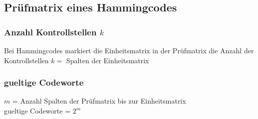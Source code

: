 \subsection{Prüfmatrix eines Hammingcodes}

\subsubsection{Anzahl Kontrollstellen $k$}
Bei Hammingcodes markiert die Einheitsmatrix in der Prüfmatrix die Anzahl der Kontrollstellen \colorbox{lightlightgrey}{$k = $ Spalten der Einheitsmatrix}

\subsubsection{gueltige Codeworte}
$m$ = Anzahl Spalten der Prüfmatrix bis zur Einheitsmatrix\\
\colorbox{lightlightgrey}{gueltige Codeworte = $2^m$}
